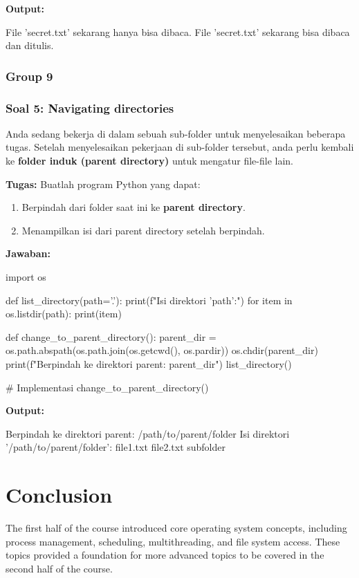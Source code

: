 \documentclass[12pt]{article}
\begin{document}
\textbf{Output:}
\begin{python}
File 'secret.txt' sekarang hanya bisa dibaca.
File 'secret.txt' sekarang bisa dibaca dan ditulis.
\end{python}

\subsubsection{Group 9}
\subsubsection*{Soal 5: Navigating directories}
Anda sedang bekerja di dalam sebuah sub-folder untuk menyelesaikan beberapa tugas. Setelah menyelesaikan pekerjaan di sub-folder tersebut, anda perlu kembali ke \textbf{folder induk (parent directory)} untuk mengatur file-file lain.

\textbf{Tugas:} Buatlah program Python yang dapat:
\begin{enumerate}
    \item Berpindah dari folder saat ini ke \textbf{parent directory}.
    \item Menampilkan isi dari parent directory setelah berpindah.
\end{enumerate}

\textbf{Jawaban:}
\begin{python}
import os

def list_directory(path='.'):
    print(f"Isi direktori '{path}':")
    for item in os.listdir(path):
        print(item)

def change_to_parent_directory():
    parent_dir = os.path.abspath(os.path.join(os.getcwd(), os.pardir))
    os.chdir(parent_dir)
    print(f"Berpindah ke direktori parent: {parent_dir}")
    list_directory()

# Implementasi
change_to_parent_directory()
\end{python}

\textbf{Output:}
\begin{python}
Berpindah ke direktori parent: /path/to/parent/folder
Isi direktori '/path/to/parent/folder':
file1.txt
file2.txt
subfolder
\end{python}

\section{Conclusion}
The first half of the course introduced core operating system concepts, including process management, scheduling, multithreading, and file system access. These topics provided a foundation for more advanced topics to be covered in the second half of the course.
\end{document}
